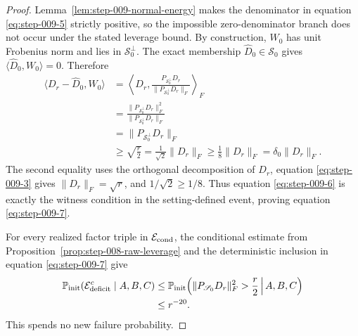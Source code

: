 \begin{proof}
Lemma~\ref{lem:step-009-normal-energy} makes the
denominator in equation \eqref{eq:step-009-5} strictly positive, so the impossible
zero-denominator branch does not occur under the stated leverage bound. By construction,
\(W_0\) has unit Frobenius norm and lies in \(\mathscr S_0^\perp\).
The exact membership \(\widehat D_0\in\mathscr S_0\) gives
\(\langle\widehat D_0,W_0\rangle=0\). Therefore
\begin{equation}
\begin{aligned}
  \langle D_r-\widehat D_0,W_0\rangle
  &=\left\langle D_r,
    \frac{P_{\mathscr S_0^\perp}D_r}
    {\|P_{\mathscr S_0^\perp}D_r\|_F}\right\rangle_F\\
  &=\frac{\|P_{\mathscr S_0^\perp}D_r\|_F^2}
    {\|P_{\mathscr S_0^\perp}D_r\|_F}\\
  &=\|P_{\mathscr S_0^\perp}D_r\|_F\\
  &\ge\sqrt{\frac r2}
   =\frac1{\sqrt2}\|D_r\|_F
   \ge\frac18\|D_r\|_F
   =\delta_0\|D_r\|_F.
\end{aligned}\label{eq:step-009-8}
\end{equation}
The second equality uses the orthogonal decomposition of \(D_r\), equation
\eqref{eq:step-009-3} gives \(\|D_r\|_F=\sqrt r\), and
\(1/\sqrt2\ge1/8\). Thus equation \eqref{eq:step-009-6} is exactly the witness condition in
the setting-defined event, proving equation \eqref{eq:step-009-7}. 

For every realized factor triple in \(\mathcal E_{\rm cond}\), the conditional estimate from Proposition~\ref{prop:step-008-raw-leverage} and the deterministic inclusion in
equation \eqref{eq:step-009-7} give
\begin{equation}
\begin{aligned}
  \mathbb P_{\rm init}(\mathcal E_{\rm deficit}^{c}\mid A,B,C)
  &\le
  \mathbb P_{\rm init}\!\left(
    \|P_{\mathscr S_0}D_r\|_F^2>\frac r2\,\middle|\,A,B,C
  \right)\\
  &\le r^{-20}.
\end{aligned}\label{eq:step-009-9}
\end{equation}
This spends no new failure probability.

\end{proof}

